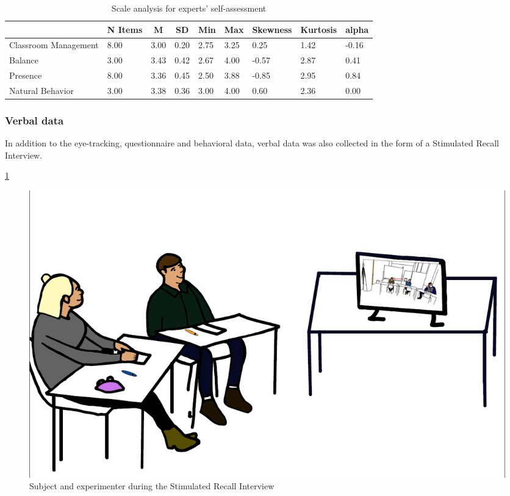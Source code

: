 \documentclass[
  man,floatsintext]{apa6}
\begin{document}
\begin{table}[h]

\begin{center}
\begin{threeparttable}

\caption{\label{tab:presence_questionnaire_experts}Scale analysis for experts' self-assessment}

\tiny{

\begin{tabular}{lllllllll}
\toprule
 & \multicolumn{1}{c}{N Items} & \multicolumn{1}{c}{M} & \multicolumn{1}{c}{SD} & \multicolumn{1}{c}{Min} & \multicolumn{1}{c}{Max} & \multicolumn{1}{c}{Skewness} & \multicolumn{1}{c}{Kurtosis} & \multicolumn{1}{c}{alpha}\\
\midrule
Classroom Management & 8.00 & 3.00 & 0.20 & 2.75 & 3.25 & 0.25 & 1.42 & -0.16\\
Balance & 3.00 & 3.43 & 0.42 & 2.67 & 4.00 & -0.57 & 2.87 & 0.41\\
Presence & 8.00 & 3.36 & 0.45 & 2.50 & 3.88 & -0.85 & 2.95 & 0.84\\
Natural Behavior & 3.00 & 3.38 & 0.36 & 3.00 & 4.00 & 0.60 & 2.36 & 0.00\\
\bottomrule
\end{tabular}

}

\end{threeparttable}
\end{center}

\end{table}

\hypertarget{verbal-data}{%
\subsubsection{Verbal data}\label{verbal-data}}

In addition to the eye-tracking, questionnaire and behavioral data, verbal data was also collected in the form of a Stimulated Recall Interview.

\ref{fig:sri}

\begin{figure}

{\centering \includegraphics{./pictures/sri} 

}

\caption{Subject and experimenter during the Stimulated Recall Interview}\label{fig:sri}
\end{figure}
\end{document}
